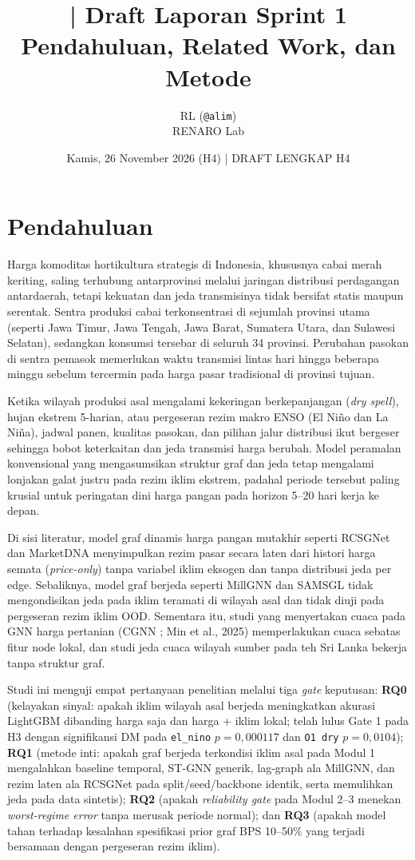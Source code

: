 \documentclass[11pt,a4paper]{article}
\title{\jobid{RL-H4-01} | Draft Laporan Sprint 1\\
\large Pendahuluan, Related Work, dan Metode}
\author{RL (\texttt{@alim}) \\ \small RENARO Lab}
\date{Kamis, 26 November 2026 (H4) \quad | \quad \textcolor{blue!70!black}{DRAFT LENGKAP H4}}
\begin{document}
\maketitle

\section{Pendahuluan}
Harga komoditas hortikultura strategis di Indonesia, khususnya cabai merah keriting,
saling terhubung antarprovinsi melalui jaringan distribusi perdagangan antardaerah,
tetapi kekuatan dan jeda transmisinya tidak bersifat statis maupun serentak.
Sentra produksi cabai terkonsentrasi di sejumlah provinsi utama (seperti Jawa Timur,
Jawa Tengah, Jawa Barat, Sumatera Utara, dan Sulawesi Selatan), sedangkan konsumsi
tersebar di seluruh 34 provinsi. Perubahan pasokan di sentra pemasok memerlukan waktu
transmisi lintas hari hingga beberapa minggu sebelum tercermin pada harga pasar
tradisional di provinsi tujuan.

Ketika wilayah produksi asal mengalami kekeringan berkepanjangan (\textit{dry spell}),
hujan ekstrem 5-harian, atau pergeseran rezim makro ENSO (El Ni\~no dan La Ni\~na),
jadwal panen, kualitas pasokan, dan pilihan jalur distribusi ikut bergeser sehingga
bobot keterkaitan dan jeda transmisi harga berubah. Model peramalan konvensional yang
mengasumsikan struktur graf dan jeda tetap mengalami lonjakan galat justru pada rezim
iklim ekstrem, padahal periode tersebut paling krusial untuk peringatan dini harga pangan
pada horizon 5--20 hari kerja ke depan.

Di sisi literatur, model graf dinamis harga pangan mutakhir seperti RCSGNet \cite{rcsgnet2026}
dan MarketDNA \cite{marketdna2026} menyimpulkan rezim pasar secara laten dari histori harga
semata (\textit{price-only}) tanpa variabel iklim eksogen dan tanpa distribusi jeda per edge.
Sebaliknya, model graf berjeda seperti MillGNN \cite{millgnn2025} dan SAMSGL \cite{samsgl2023}
tidak mengondisikan jeda pada iklim teramati di wilayah asal dan tidak diuji pada pergeseran
rezim iklim OOD. Sementara itu, studi yang menyertakan cuaca pada GNN harga pertanian
(CGNN \cite{cgnn2023}; Min et al., 2025) memperlakukan cuaca sebatas fitur node lokal, dan
studi jeda cuaca wilayah sumber pada teh Sri Lanka \cite{tea2026} bekerja tanpa struktur graf.

Studi ini menguji empat pertanyaan penelitian melalui tiga \textit{gate} keputusan:
\textbf{RQ0} (kelayakan sinyal: apakah iklim wilayah asal berjeda meningkatkan akurasi
LightGBM dibanding harga saja dan harga + iklim lokal; telah lulus Gate 1 pada H3 dengan
signifikansi DM pada \texttt{el\_nino} $p=0{,}000117$ dan \texttt{O1 dry} $p=0{,}0104$);
\textbf{RQ1} (metode inti: apakah graf berjeda terkondisi iklim asal pada Modul 1 mengalahkan
baseline temporal, ST-GNN generik, lag-graph ala MillGNN, dan rezim laten ala RCSGNet pada
split/seed/backbone identik, serta memulihkan jeda pada data sintetis);
\textbf{RQ2} (apakah \textit{reliability gate} pada Modul 2--3 menekan \textit{worst-regime error}
tanpa merusak periode normal); dan
\textbf{RQ3} (apakah model tahan terhadap kesalahan spesifikasi prior graf BPS 10--50\%
yang terjadi bersamaan dengan pergeseran rezim iklim).
\end{document}
